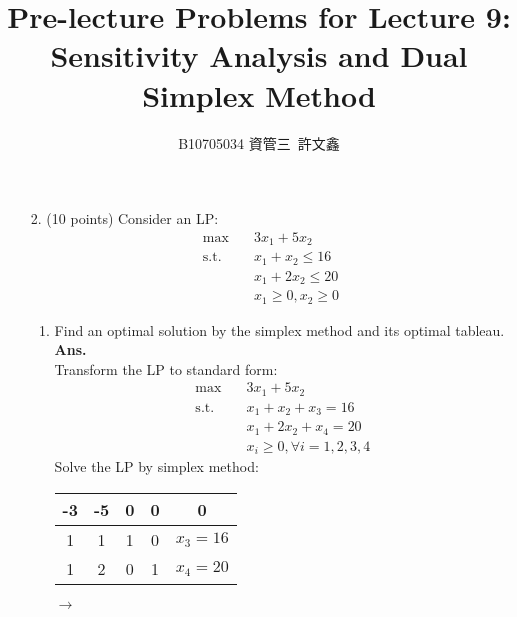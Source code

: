 \documentclass[12pt]{article}
\title{Pre-lecture Problems for Lecture 9:\\ Sensitivity Analysis and Dual Simplex Method}
\author{B10705034 資管三\ 許文鑫}
\begin{document}
\maketitle
\begin{enumerate}
      \item[2.] (10 points) Consider an LP:
            \begin{align*}
                  \max \quad        & 3x_1 + 5x_2            \\
                  \text{s.t.} \quad & x_1 + x_2 \leq 16      \\
                                    & x_1 + 2x_2 \leq 20     \\
                                    & x_1 \geq 0, x_2 \geq 0
            \end{align*}
            \begin{enumerate}
                  \item Find an optimal solution by the simplex method and its optimal tableau.\\
                        \textbf{Ans.}\\
                        Transform the LP to standard form:
                        \begin{align*}
                              \max \quad        & 3x_1 + 5x_2                     \\
                              \text{s.t.} \quad & x_1 + x_2 + x_3 = 16            \\
                                                & x_1 + 2x_2 +x_4 = 20            \\
                                                & x_i \geq 0, \forall i = 1,2,3,4
                        \end{align*}
                        Solve the LP by simplex method:
                        \begin{table}[H]
                              \centering
                              \begin{tabular}{cccc|c}
                                    -3 & -5 & 0 & 0 & 0        \\
                                    \hline
                                    1  & 1  & 1 & 0 & $x_3=16$ \\
                                    1  & 2  & 0 & 1 & $x_4=20$ \\
                              \end{tabular} $\rightarrow$
                              \begin{tabular}{cccc|c}

\end{tabular}
\end{table}
\end{enumerate}
\end{enumerate}
\end{document}
